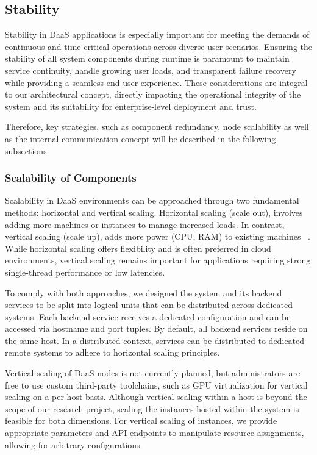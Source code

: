 \documentclass[runningheads]{llncs}
\begin{document}
\subsection{Stability}
Stability in DaaS applications is especially important
for meeting the demands of continuous and time-critical operations
across diverse user scenarios.
Ensuring the stability of all system components during runtime is paramount
to maintain service continuity, handle growing user loads,
and transparent failure recovery while providing a seamless end-user experience.
These considerations are integral to our architectural concept,
directly impacting the operational integrity of the system
and its suitability for enterprise-level deployment and trust.

Therefore, key strategies, such as component redundancy, node scalability
as well as the internal communication concept
will be described in the following subsections.

\subsubsection{Scalability of Components}
Scalability in DaaS environments
can be approached through two fundamental methods: horizontal and vertical scaling.
Horizontal scaling (scale out), involves adding more machines or instances
to manage increased loads.
In contrast, vertical scaling (scale up),
adds more power (CPU, RAM) to existing machines
~\cite{vaquero2011dynamically}.
While horizontal scaling offers flexibility
and is often preferred in cloud environments,
vertical scaling remains important for applications
requiring strong single-thread performance or low latencies.

To comply with both approaches,
we designed the system and its backend services
to be split into logical units that can be distributed across dedicated systems.
Each backend service receives a dedicated configuration
and can be accessed via hostname and port tuples.
By default, all backend services reside on the same host.
In a distributed context, services can be distributed to dedicated remote systems
to adhere to horizontal scaling principles.

Vertical scaling of DaaS nodes is not currently planned,
but administrators are free to use custom third-party toolchains,
such as GPU virtualization for vertical scaling on a per-host basis.
Although vertical scaling within a host
is beyond the scope of our research project,
scaling the instances hosted within the system is feasible for both dimensions.
For vertical scaling of instances, we provide appropriate parameters
and API endpoints to manipulate resource assignments,
allowing for arbitrary configurations.
\end{document}

